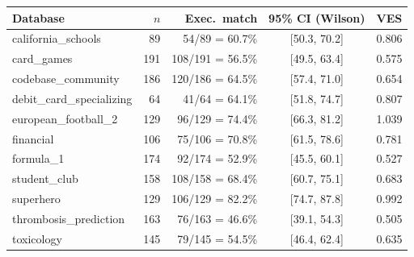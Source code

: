 \begin{tabular}{lrrcc}
\toprule
Database & $n$ & Exec.\ match & 95\% CI (Wilson) & VES \\
\midrule
california\_schools & 89 & 54/89 = 60.7\% & [50.3, 70.2] & 0.806 \\
card\_games & 191 & 108/191 = 56.5\% & [49.5, 63.4] & 0.575 \\
codebase\_community & 186 & 120/186 = 64.5\% & [57.4, 71.0] & 0.654 \\
debit\_card\_specializing & 64 & 41/64 = 64.1\% & [51.8, 74.7] & 0.807 \\
european\_football\_2 & 129 & 96/129 = 74.4\% & [66.3, 81.2] & 1.039 \\
financial & 106 & 75/106 = 70.8\% & [61.5, 78.6] & 0.781 \\
formula\_1 & 174 & 92/174 = 52.9\% & [45.5, 60.1] & 0.527 \\
student\_club & 158 & 108/158 = 68.4\% & [60.7, 75.1] & 0.683 \\
superhero & 129 & 106/129 = 82.2\% & [74.7, 87.8] & 0.992 \\
thrombosis\_prediction & 163 & 76/163 = 46.6\% & [39.1, 54.3] & 0.505 \\
toxicology & 145 & 79/145 = 54.5\% & [46.4, 62.4] & 0.635 \\
\bottomrule
\end{tabular}
